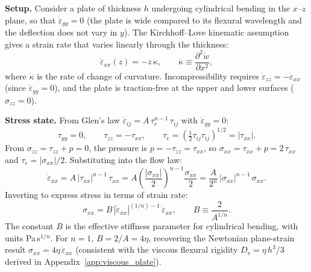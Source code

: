 \documentclass[11pt]{article}
\begin{document}
\medskip
\noindent\textbf{Setup.}  Consider a plate of thickness $h$ undergoing cylindrical bending in the $x$--$z$ plane, so that $\dot{\varepsilon}_{yy} = 0$ (the plate is wide compared to its flexural wavelength and the deflection does not vary in $y$).  The Kirchhoff--Love kinematic assumption gives a strain rate that varies linearly through the thickness:
\begin{equation}
  \dot{\varepsilon}_{xx}(z) = -z\,\dot{\kappa}, \qquad \dot{\kappa} \equiv \frac{\partial^2 \dot{w}}{\partial x^2},
  \label{eq:nl_strain_rate}
\end{equation}
where $\dot{\kappa}$ is the rate of change of curvature.  Incompressibility requires $\dot{\varepsilon}_{zz} = -\dot{\varepsilon}_{xx}$ (since $\dot{\varepsilon}_{yy} = 0$), and the plate is traction-free at the upper and lower surfaces ($\sigma_{zz} = 0$).

\medskip
\noindent\textbf{Stress state.}  From Glen's law $\dot{\varepsilon}_{ij} = A\,\tau_e^{n-1}\,\tau_{ij}$ with $\dot{\varepsilon}_{yy} = 0$:
\begin{equation}
  \tau_{yy} = 0, \qquad \tau_{zz} = -\tau_{xx}, \qquad \tau_e = \left(\tfrac{1}{2}\tau_{ij}\tau_{ij}\right)^{1/2} = |\tau_{xx}|.
  \label{eq:nl_plate_stress_state}
\end{equation}
From $\sigma_{zz} = \tau_{zz} + p = 0$, the pressure is $p = -\tau_{zz} = \tau_{xx}$, so $\sigma_{xx} = \tau_{xx} + p = 2\,\tau_{xx}$ and $\tau_e = |\sigma_{xx}|/2$.  Substituting into the flow law:
\begin{equation}
  \dot{\varepsilon}_{xx} = A\,|\tau_{xx}|^{n-1}\,\tau_{xx} = A\left(\frac{|\sigma_{xx}|}{2}\right)^{n-1}\!\frac{\sigma_{xx}}{2} = \frac{A}{2^n}\,|\sigma_{xx}|^{n-1}\,\sigma_{xx}.
  \label{eq:nl_plate_flow}
\end{equation}
Inverting to express stress in terms of strain rate:
\begin{equation}
  \sigma_{xx} = B\,|\dot{\varepsilon}_{xx}|^{(1/n)-1}\,\dot{\varepsilon}_{xx}, \qquad B \equiv \frac{2}{A^{1/n}}.
  \label{eq:nl_stress_inversion}
\end{equation}
The constant $B$ is the effective stiffness parameter for cylindrical bending, with units Pa\,s$^{1/n}$.  For $n = 1$, $B = 2/A = 4\eta$, recovering the Newtonian plane-strain result $\sigma_{xx} = 4\eta\,\dot{\varepsilon}_{xx}$ (consistent with the viscous flexural rigidity $D_v = \eta\,h^3/3$ derived in Appendix~\ref{app:viscous_plate}).
\end{document}
